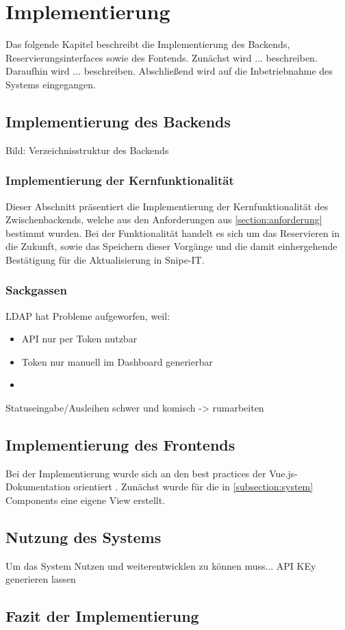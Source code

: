 
\chapter{Implementierung}
\label{chapter-implementierung}
Das folgende Kapitel beschreibt die Implementierung des Backends, Reservierungsinterfaces sowie des
Fontends. Zunächst wird ... beschreiben. Daraufhin wird ... beschreiben. Abschließend wird auf die
Inbetriebnahme des Systems eingegangen.


\section{Implementierung des Backends}
Bild: Verzeichnisstruktur des Backends

\subsection{Implementierung der Kernfunktionalität}
Dieser Abschnitt präsentiert die Implementierung der Kernfunktionalität des Zwischenbackends,
welche aus den Anforderungen aus \ref{section:anforderung} bestimmt wurden. Bei der Funktionalität
handelt es sich um das Reservieren in die Zukunft, sowie das Speichern dieser Vorgänge und die
damit einhergehende Bestätigung für die Aktualisierung in Snipe-IT.


\subsection{Sackgassen}
LDAP hat Probleme aufgeworfen, weil:

\begin{itemize}
  \item API nur per Token nutzbar
  \item Token nur manuell im Dashboard generierbar
  \item
\end{itemize}
Statuseingabe/Ausleihen schwer und komisch -> rumarbeiten

\section{Implementierung des Frontends}

Bei der Implementierung wurde sich an den best practices der
Vue.js-Dokumentation orientiert . Zunächst wurde für die
in \ref{subsection:system} Components eine eigene View erstellt.


\section{Nutzung des Systems}
Um das System Nutzen und weiterentwicklen zu können muss...
API KEy generieren lassen

\section{Fazit der Implementierung}